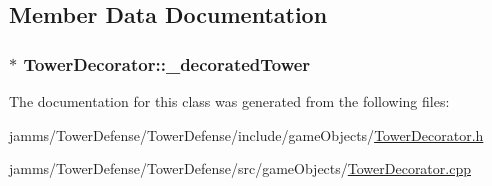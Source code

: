 \subsection{Member Data Documentation}
\hypertarget{class_tower_decorator_af868e125be4dd2b47430d067a8a2c483}{
\subsubsection[{\+\_\+decorated\+Tower}]{$\ast$ Tower\+Decorator\+::\+\_\+decorated\+Tower\hspace{0.3cm}{\ttfamily [protected]}}}\label{class_tower_decorator_af868e125be4dd2b47430d067a8a2c483}


The documentation for this class was generated from the following files\+:\begin{DoxyCompactItemize}
\item 
jamms/\+Tower\+Defense/\+Tower\+Defense/include/game\+Objects/\hyperlink{_tower_decorator_8h}{Tower\+Decorator.\+h}\item 
jamms/\+Tower\+Defense/\+Tower\+Defense/src/game\+Objects/\hyperlink{_tower_decorator_8cpp}{Tower\+Decorator.\+cpp}\end{DoxyCompactItemize}
